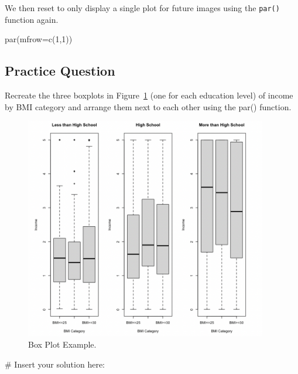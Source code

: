\documentclass[
  letterpaper,
]{krantz}
\makeatletter
\newenvironment{Shaded}{\begin{snugshade}}{\end{snugshade}}
\newcommand{\AttributeTok}[1]{\textcolor[rgb]{0.40,0.45,0.13}{#1}}
\newcommand{\CommentTok}[1]{\textcolor[rgb]{0.37,0.37,0.37}{#1}}
\newcommand{\DecValTok}[1]{\textcolor[rgb]{0.68,0.00,0.00}{#1}}
\newcommand{\FunctionTok}[1]{\textcolor[rgb]{0.28,0.35,0.67}{#1}}
\newcommand{\NormalTok}[1]{\textcolor[rgb]{0.00,0.23,0.31}{#1}}
\newenvironment{kframe}{%
\medskip{}
\setlength{\fboxsep}{.8em}
 \def\at@end@of@kframe{}%
 \ifinner\ifhmode%
  \def\at@end@of@kframe{\end{minipage}}%
  \begin{minipage}{\columnwidth}%
 \fi\fi%
 \def\FrameCommand##1{\hskip\@totalleftmargin \hskip-\fboxsep
 \colorbox{shadecolor}{##1}\hskip-\fboxsep
     \hskip-\linewidth \hskip-\@totalleftmargin \hskip\columnwidth}%
 \MakeFramed {\advance\hsize-\width
   \@totalleftmargin\z@ \linewidth\hsize
   \@setminipage}}%
 {\par\unskip\endMakeFramed%
 \at@end@of@kframe}
\renewenvironment{Shaded}{\begin{kframe}}{\end{kframe}}
\makeatother
\begin{document}
We then reset to only display a single plot for future images using the
\texttt{par()} function again.

\begin{Shaded}
\begin{Highlighting}[]
\FunctionTok{par}\NormalTok{(}\AttributeTok{mfrow=}\FunctionTok{c}\NormalTok{(}\DecValTok{1}\NormalTok{,}\DecValTok{1}\NormalTok{))}
\end{Highlighting}
\end{Shaded}

\hypertarget{practice-question-7}{%
\subsection{Practice Question}\label{practice-question-7}}

Recreate the three boxplots in Figure~\ref{fig-pq2} (one for each
education level) of income by BMI category and arrange them next to each
other using the par() function.

\begin{figure}

{\centering \includegraphics[width=4.16667in,height=\textheight]{book/images/4-practicequestion2answer.png}

}

\caption{\label{fig-pq2}Box Plot Example.}

\end{figure}

\begin{Shaded}
\begin{Highlighting}[]
\CommentTok{\# Insert your solution here:}
\end{Highlighting}
\end{Shaded}
\end{document}
